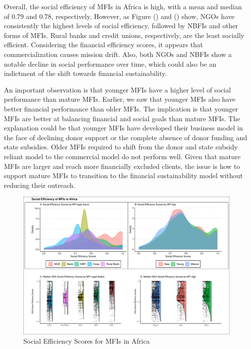 \documentclass[
]{article}
\begin{document}
Overall, the social efficiency of MFIs in Africa is high, with a mean
and median of 0.79 and 0.78, respectively. However, as Figure () and ()
show, NGOs have consistently the highest levels of social efficiency,
followed by NBFIs and other forms of MFIs. Rural banks and credit
unions, respectively, are the least socially efficient. Considering the
financial efficiency scores, it appears that commercialization causes
mission drift. Also, both NGOs and NBFIs show a notable decline in
social performance over time, which could also be an indictment of the
shift towards financial sustainability.

An important observation is that younger MFIs have a higher level of
social performance than mature MFIs. Earlier, we saw that younger MFIs
also have better financial performance than older MFIs. The implication
is that younger MFIs are better at balancing financial and social goals
than mature MFIs. The explanation could be that younger MFIs have
developed their business model in the face of declining donor support or
the complete absence of donor funding and state subsidies. Older MFIs
required to shift from the donor and state subsidy reliant model to the
commercial model do not perform well. Given that mature MFIs are larger
and reach more financially excluded clients, the issue is how to support
mature MFIs to transition to the financial sustainability model without
reducing their outreach.

\begin{landscape}

\begin{figure}
\centering
\includegraphics{finsoc_efficiency_files/figure-latex/unnamed-chunk-22-1.pdf}
\caption{Social Efficiency Scores for MFIs in Africa}
\end{figure}

\end{landscape}
\end{document}
